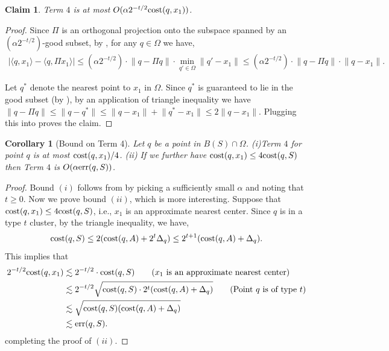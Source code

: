 \documentclass[11pt]{article}
\newtheorem{corollary}[lemma]{Corollary}
\newtheorem{claim}[lemma]{Claim}
\theoremstyle{restate}
\theoremstyle{definition}
\newcommand{\norm}[1]{\ensuremath{\|#1\|}}
\newcommand{\cost}{\textnormal{cost}}
\newcommand{\err}{\textnormal{err}}
\begin{document}
\begin{claim}\label{clm-term-4-interim}
Term $4$ is at most $O(\alpha 2^{-t/2} \cost(q,x_1))$.
\end{claim}
\begin{proof}
    Since $\Pi$ is an orthogonal projection onto the subspace spanned by an  $(\alpha 2^{-t/2})$-good subset, by ,  for any $q \in \Omega$ we have, 
\begin{align}\label{eq: inter-guarantee-1}
    |\langle q,x_1 \rangle - \langle q, \Pi x_1\rangle| \leq (\alpha2^{-t/2}) \cdot \norm{q - \Pi q} \cdot \min_{q' \in \Omega} \norm{q' - x_1} \leq (\alpha2^{-t/2}) \cdot \norm{q - \Pi q} \cdot \norm{q - x_1}.
\end{align}

Let $q^{*}$ denote the nearest point to $x_1$  in $\Omega$. Since $q^*$ is guaranteed to lie in the good subset (by ), by an application of triangle inequality we have  $\norm{q - \Pi q} \leq \norm{q - q^*} \leq \norm{q - x_1} + \norm{q^{*} - x_1} \leq 2 \norm{q - x_1}$. Plugging this into  proves the claim.
\end{proof}
\begin{corollary}[Bound on Term 4]\label{clm: term4-bound}  Let $q$ be a point in $B(S) \cap \Omega$. (i)Term $4$ for point $q$ is at most $\cost(q,x_1)/4$. (ii) If we further have $\cost(q, x_1) \leq 4 \cost(q,S)$ then Term $4$ is $O(\alpha \err(q,S))$.
\end{corollary}
\begin{proof} 
Bound $(i)$ follows from  by picking a sufficiently small $\alpha$ and noting that $t \geq 0$. Now we prove bound $(ii)$, which is more interesting. Suppose that $\cost(q, x_1) \leq 4 \cost(q, S)$, i.e., $x_1$ is an approximate nearest center.  Since $q$ is in a type $t$ cluster, by the triangle inequality, we have, 
\begin{align}
\cost(q,S) \leq 2(\cost(q,A) + 2^t \Delta_q) 
    \leq 2^{t+1}(\cost(q,A) + \Delta_q).
\end{align}
This implies that 
\begin{align*}
    2^{-t/2} \cost(q,x_1) &\lesssim 2^{-t/2} \cdot \cost(q,S) \tag{$x_1$ is an approximate nearest center}\\ &\lesssim  2^{-t/2}\sqrt{\cost(q,S) \cdot 2^{t} (\cost(q,A) + \Delta_q) } \tag{Point $q$ is of type $t$}\\
    &\lesssim \sqrt{\cost(q,S) (\cost(q,A)+\Delta_q)}\\
    &\lesssim \err(q,S)
    .
\end{align*}
completing the proof of $(ii)$.
\end{proof}
\end{document}
